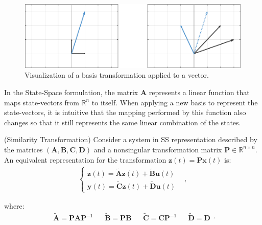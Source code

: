 \documentclass[a4paper,11pt]{book}
\numberwithin{figure}{chapter}
\numberwithin{equation}{chapter}
\numberwithin{table}{chapter}
\newtheorem{theorem}{Theorem}[chapter]
\theoremstyle{definition}
\newcounter{boxed-theorem}
\newenvironment{boxed-theorem}[1]
{\colorlet{shadecolor}{pastelBlue2!10} \begin{shaded} \begin{theorem}{#1}}
{\end{theorem} \end{shaded}}
\newcounter{boxed-definition}
\newcounter{boxed-example}
\begin{document}
\begin{figure}[ht]
    \centering
    \includegraphics[width=\textwidth]{chapter2/similarity01}
    \caption{Visualization of a basis transformation applied to a vector.}
    \label{fig:similarity01}
\end{figure}

In the State-Space formulation, the matrix $\bm{A}$ represents a linear function that maps state-vectors from $\mathbb{R}^{n}$ to itself. When applying a new basis to represent the state-vectors, it is intuitive that the mapping performed by this function also changes so that it still represents the same linear combination of the states.

\begin{boxed-theorem}{(Similarity Transformation)}
    Consider a system in SS representation described by the matrices $(\bm{A}, \bm{B}, \bm{C}, \bm{D})$ and a nonsingular transformation matrix $\bm{P} \in \mathbb{R}^{n \times n}$. An equivalent representation for the transformation $\bm{z}(t) = \bm{P} \bm{x}(t)$ is:
    \begin{align}
    \begin{cases}
        \dot{\bm{z}}(t) = \tilde{\bm{A}} \bm{z}(t) + \tilde{\bm{B}} \bm{u}(t) & \\
        \bm{y}(t) = \tilde{\bm{C}} \bm{z}(t) + \tilde{\bm{D}} \bm{u}(t)
    \end{cases} 
    ,\end{align}
    
    \noindent where:
    \begin{equation}
        \begin{matrix}
            \tilde{\bm{A}} = \bm{P} \bm{A} \bm{P}^{-1} & & \tilde{\bm{B}} = \bm{P} \bm{B} & & \tilde{\bm{C}} = \bm{C} \bm{P}^{-1} & & \tilde{\bm{D}} = \bm{D}
        \end{matrix}
    .\end{equation}
\end{boxed-theorem}
\end{document}
